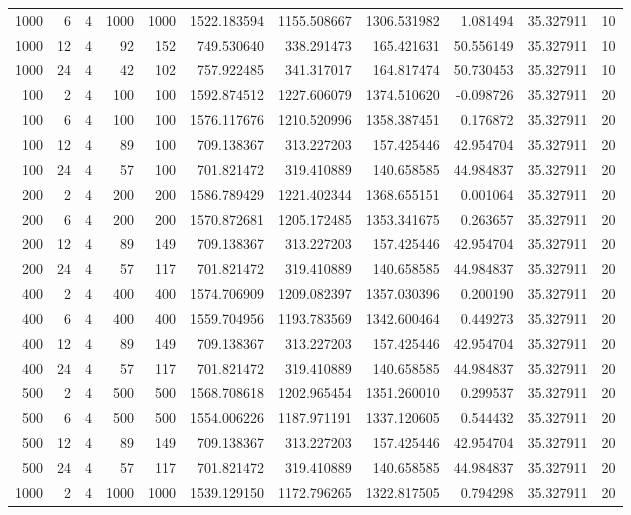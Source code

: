 \begin{table}
\begin{tabular}{rrrrrrrrrrr}
1000 & 6 & 4 & 1000 & 1000 & 1522.183594 & 1155.508667 & 1306.531982 & 1.081494 & 35.327911 & 10 \\
1000 & 12 & 4 & 92 & 152 & 749.530640 & 338.291473 & 165.421631 & 50.556149 & 35.327911 & 10 \\
1000 & 24 & 4 & 42 & 102 & 757.922485 & 341.317017 & 164.817474 & 50.730453 & 35.327911 & 10 \\
100 & 2 & 4 & 100 & 100 & 1592.874512 & 1227.606079 & 1374.510620 & -0.098726 & 35.327911 & 20 \\
100 & 6 & 4 & 100 & 100 & 1576.117676 & 1210.520996 & 1358.387451 & 0.176872 & 35.327911 & 20 \\
100 & 12 & 4 & 89 & 100 & 709.138367 & 313.227203 & 157.425446 & 42.954704 & 35.327911 & 20 \\
100 & 24 & 4 & 57 & 100 & 701.821472 & 319.410889 & 140.658585 & 44.984837 & 35.327911 & 20 \\
200 & 2 & 4 & 200 & 200 & 1586.789429 & 1221.402344 & 1368.655151 & 0.001064 & 35.327911 & 20 \\
200 & 6 & 4 & 200 & 200 & 1570.872681 & 1205.172485 & 1353.341675 & 0.263657 & 35.327911 & 20 \\
200 & 12 & 4 & 89 & 149 & 709.138367 & 313.227203 & 157.425446 & 42.954704 & 35.327911 & 20 \\
200 & 24 & 4 & 57 & 117 & 701.821472 & 319.410889 & 140.658585 & 44.984837 & 35.327911 & 20 \\
400 & 2 & 4 & 400 & 400 & 1574.706909 & 1209.082397 & 1357.030396 & 0.200190 & 35.327911 & 20 \\
400 & 6 & 4 & 400 & 400 & 1559.704956 & 1193.783569 & 1342.600464 & 0.449273 & 35.327911 & 20 \\
400 & 12 & 4 & 89 & 149 & 709.138367 & 313.227203 & 157.425446 & 42.954704 & 35.327911 & 20 \\
400 & 24 & 4 & 57 & 117 & 701.821472 & 319.410889 & 140.658585 & 44.984837 & 35.327911 & 20 \\
500 & 2 & 4 & 500 & 500 & 1568.708618 & 1202.965454 & 1351.260010 & 0.299537 & 35.327911 & 20 \\
500 & 6 & 4 & 500 & 500 & 1554.006226 & 1187.971191 & 1337.120605 & 0.544432 & 35.327911 & 20 \\
500 & 12 & 4 & 89 & 149 & 709.138367 & 313.227203 & 157.425446 & 42.954704 & 35.327911 & 20 \\
500 & 24 & 4 & 57 & 117 & 701.821472 & 319.410889 & 140.658585 & 44.984837 & 35.327911 & 20 \\
1000 & 2 & 4 & 1000 & 1000 & 1539.129150 & 1172.796265 & 1322.817505 & 0.794298 & 35.327911 & 20 \\

\end{tabular}
\end{table}
